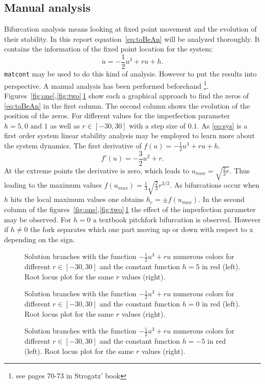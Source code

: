 \subsection{Manual analysis}
Bifurcation analysis means looking at fixed point movement and the evolution of their stability. In this report equation~\ref{eq:toBeAn} will be analyzed thoroughly. It contains the information of the fixed point location for the system:
\begin{equation}
\dot{u} = -\frac{1}{2} u^3 + ru + h. 
\label{eq:sys} 
\end{equation}
\texttt{matcont} may be used to do this kind of analysis. However to put the results into perspective. A manual analysis has been performed beforehand \footnote{see pages 70-73 in Strogatz' book}. Figures~\ref{fig:one},\ref{fig:two}\,\ref{fig:tree} show each a graphical approach to find the zeros of \ref{eq:toBeAn} in the first column. The second column shows the evolution of the position of the zeros. For different values for the imperfection parameter $h = 5,0 \text{ and } 1$ as well as $r \in [-30,30]$ with a step size of $0.1$.
As \ref{eq:sys} is a first order system linear stability analysis may be employed to learn more about the system dynamics. The first derivative of $f(u) = -\frac{1}{2} u^3 + ru + h$. 
\begin{equation}
f'(u) = -\frac{3}{2}u^2 + r.
\end{equation}
At the extreme points the derivative is zero, which leads to $u_{max} = \sqrt{\frac{2}{3}r}$. Thus leading to the maximum values $f(u_{max})= \frac{1}{3} \sqrt{\frac{2}{3}}r^{3/2}$. As bifurcations occur when $h$ hits the local maximum values one obtains $h_c = \pm f(u_{max})$. In the second column of the figures~\ref{fig:one},\ref{fig:two}\,\ref{fig:tree} the effect of the imperfection parameter may be observed. For $h = 0$ a textbook pitchfork bifurcation is observed. However if $h \ne 0$ the fork separates which one part moving up or down with respect to x depending on the sign.
\begin{figure}
\centering


\caption{Solution branches with the function $-\frac{1}{2} u^3 + ru $ numerous colors for different $r\in [-30,30]$ and the constant function $h=5$ in red (left). Root locus plot for the same $r$ values (right).}
\label{fig:one}


\caption{Solution branches with the function $-\frac{1}{2} u^3 + ru $ numerous colors for different $r\in [-30,30]$ and the constant function $h=0$ in red (left). Root locus plot for the same $r$ values (right).}
\label{fig:two}


\caption{Solution branches with the function $-\frac{1}{2} u^3 + ru $ numerous colors for different $r\in [-30,30]$ and the constant function $h=-5$ in red (left). Root locus plot for the same $r$ values (right).}
\label{fig:tree}
\end{figure}

